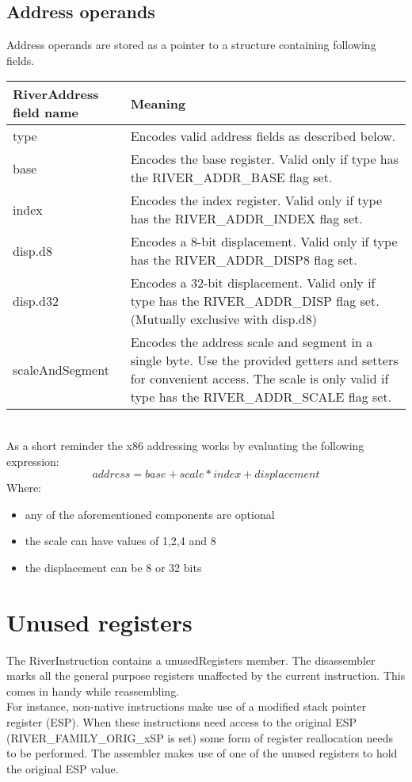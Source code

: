 \documentclass[12pt]{report}
\begin{document}
\subsection{Address operands}
\label{ssec:address-operands}
Address operands are stored as a pointer to a structure containing following fields.\\
\begin{tabular}{| p{6cm} | p{10cm} |}
	\hline
	\textbf{RiverAddress field name} & \textbf{Meaning}\\ \hline
	type & Encodes valid address fields as described below.\\ \hline
	base & Encodes the base register. Valid only if type has the RIVER_ADDR_BASE flag set.\\ \hline
	index & Encodes the index register. Valid only if type has the RIVER_ADDR_INDEX flag set.\\ \hline
	disp.d8 & Encodes a 8-bit displacement. Valid only if type has the RIVER_ADDR_DISP8 flag set.\\ \hline
	disp.d32 & Encodes a 32-bit displacement. Valid only if type has the RIVER_ADDR_DISP flag set. (Mutually exclusive with disp.d8)\\ \hline
	scaleAndSegment & Encodes the address scale and segment in a single byte. Use the provided getters and setters for convenient access. The scale is only valid if type has the RIVER_ADDR_SCALE flag set.\\ \hline
\end{tabular}\\
\newline
As a short reminder the x86 addressing works by evaluating the following expression:\\
\[address = base + scale * index + displacement\]
Where:
\begin{itemize}
	\item any of the aforementioned components are optional
	\item the scale can have values of 1,2,4 and 8
	\item the displacement can be 8 or 32 bits
\end{itemize}

\section{Unused registers}
\label{sec:unused-register}
The RiverInstruction contains a unusedRegisters member. The disassembler marks all the general purpose registers unaffected by the current instruction. This comes in handy while reassembling.\\
\newline
For instance, non-native instructions make use of a modified stack pointer register (ESP). When these instructions need access to the original ESP (RIVER_FAMILY_ORIG_xSP is set) some form of register reallocation needs to be performed. The assembler makes use of one of the unused registers to hold the original ESP value.\\
\end{document}

